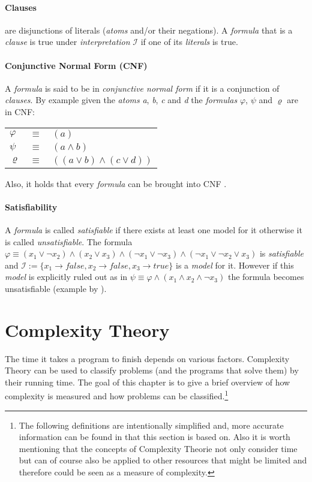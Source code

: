 \paragraph{Clauses}
are disjunctions of literals (\emph{atoms} and/or their negations). A \emph{formula} that is a \emph{clause} is true under \emph{interpretation} $\mathcal{I}$ if one of its \emph{literals} is true.

\paragraph{Conjunctive Normal Form (CNF)}
A \emph{formula} is said to be in \emph{conjunctive normal form} if it is a conjunction of \emph{clauses}. 
By example given the \emph{atoms} \emph{a}, \emph{b}, \emph{c} and \emph{d} the \emph{formulas} $\varphi$, $\psi$ and $\varrho$ are in CNF:
\begin{center}
    \begin{tabular}{ l l l }
    $\varphi$ & $\equiv$ & $(a)$\\
    $\psi$ & $\equiv$ & $(a \land b)$\\
    $\varrho$ & $\equiv$ & $((a \lor b) \land (c \lor d))$\\
\end{tabular}
\end{center}
Also, it holds that every \emph{formula} can be brought into CNF \cite{LogicForComputerScientists}.

\paragraph{Satisfiability} \label{Satisfiability} A \emph{formula} is called \emph{satisfiable} if there exists at least one model for it otherwise it is called \emph{unsatisfiable}. The formula $\varphi \equiv (x_1 \lor \neg x_2) \land (x_2 \lor x_3) \land (\neg x_1 \lor \neg x_3) \land (\neg x_1 \lor \neg x_2 \lor x_3)$ is \emph{satisfiable} and $\mathcal{I}:= \{x_1 \rightarrow false, x_2 \rightarrow false, x_3 \rightarrow true\}$ is a \emph{model} for it. However if this \emph{model} is explicitly ruled out as in $\psi \equiv \varphi \land (x_1 \land x_2 \land \neg x_3)$ the formula becomes unsatisfiable (example by \cite{10.5555/1121689}).


\section{Complexity Theory}
The time it takes a program to finish depends on various factors. Complexity Theory can be used to classify problems (and the programs that solve them) by their running time. The goal of this chapter is to give a brief overview of how complexity is measured and how problems can be classified.\footnote{The following definitions are intentionally simplified and, more accurate information can be found in \cite{IntroductionToTheTheoryOfComputation} that this section is based on. Also it is worth mentioning that the concepts of Complexity Theorie not only consider time but can of course also be applied to other resources that might be limited and therefore could be seen as a measure of complexity.}

